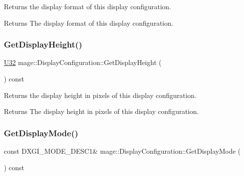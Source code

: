 Returns the display format of this display configuration.

\begin{DoxyReturn}{Returns}
The display format of this display configuration. 
\end{DoxyReturn}
\hypertarget{structmage_1_1_display_configuration_a20ad8e0f250a4e6d144f06b6042a7dee}{}\label{structmage_1_1_display_configuration_a20ad8e0f250a4e6d144f06b6042a7dee} 
\subsubsection{\texorpdfstring{Get\+Display\+Height()}{GetDisplayHeight()}}
{\footnotesize\ttfamily \hyperlink{namespacemage_a41c104c036fba3756a74e19f793eeaa1}{U32} mage\+::\+Display\+Configuration\+::\+Get\+Display\+Height (\begin{DoxyParamCaption}{ }\end{DoxyParamCaption}) const\hspace{0.3cm}{\ttfamily [noexcept]}}

Returns the display height in pixels of this display configuration.

\begin{DoxyReturn}{Returns}
The display height in pixels of this display configuration. 
\end{DoxyReturn}
\hypertarget{structmage_1_1_display_configuration_a20270be6a17deab929fce25596edabd4}{}\label{structmage_1_1_display_configuration_a20270be6a17deab929fce25596edabd4} 
\subsubsection{\texorpdfstring{Get\+Display\+Mode()}{GetDisplayMode()}}
{\footnotesize\ttfamily const D\+X\+G\+I\+\_\+\+M\+O\+D\+E\+\_\+\+D\+E\+S\+C1\& mage\+::\+Display\+Configuration\+::\+Get\+Display\+Mode (\begin{DoxyParamCaption}{ }\end{DoxyParamCaption}) const\hspace{0.3cm}{\ttfamily [noexcept]}}


